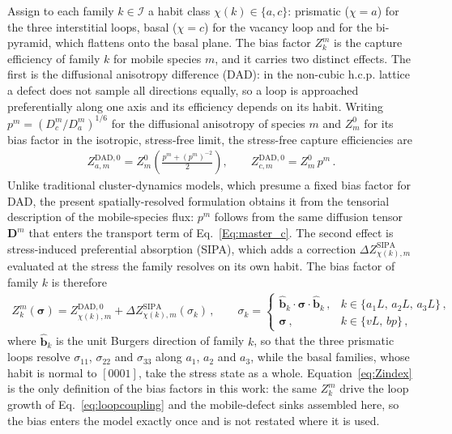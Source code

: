 \documentclass{article}
\begin{document}
Assign to each family $k\in\mathcal{I}$ a habit class $\chi(k)\in\{a,c\}$: prismatic ($\chi=a$) for the three interstitial loops, basal ($\chi=c$) for the vacancy loop and for the bi-pyramid, which flattens onto the basal plane. The bias factor $Z^m_k$ is the capture efficiency of family $k$ for mobile species $m$, and it carries two distinct effects. The first is the diffusional anisotropy difference (DAD): in the non-cubic h.c.p. lattice a defect does not sample all directions equally, so a loop is approached preferentially along one axis and its efficiency depends on its habit. Writing $p^m=(D_c^m/D_a^m)^{1/6}$ for the diffusional anisotropy of species $m$ and $Z^0_m$ for its bias factor in the isotropic, stress-free limit, the stress-free capture efficiencies are
\begin{align}\label{eq:DAD0}
Z^{\mathrm{DAD},0}_{a,m} = Z^0_m\left(\frac{p^m+(p^m)^{-2}}{2}\right),\qquad
Z^{\mathrm{DAD},0}_{c,m} = Z^0_m\, p^m\, .
\end{align}
Unlike traditional cluster-dynamics models, which presume a fixed bias factor for DAD, the present spatially-resolved formulation obtains it from the tensorial description of the mobile-species flux: $p^m$ follows from the same diffusion tensor $\bm D^m$ that enters the transport term of Eq.~\eqref{Eq:master_c}. The second effect is stress-induced preferential absorption (SIPA), which adds a correction $\Delta Z^{\mathrm{SIPA}}_{\chi(k),m}$ evaluated at the stress the family resolves on its own habit. The bias factor of family $k$ is therefore
\begin{align}\label{eq:Zindex}
Z^m_k(\bm\sigma)=Z^{\mathrm{DAD},0}_{\chi(k),m}+\Delta Z^{\mathrm{SIPA}}_{\chi(k),m}(\sigma_k)\, ,
\qquad
\sigma_k=
\begin{cases}
\hat{\bm b}_k\cdot\bm\sigma\cdot\hat{\bm b}_k\, , & k\in\{a_1L,\,a_2L,\,a_3L\}\, ,\\[2pt]
\bm\sigma\, , & k\in\{vL,\,bp\}\, ,
\end{cases}
\end{align}
where $\hat{\bm b}_k$ is the unit Burgers direction of family $k$, so that the three prismatic loops resolve $\sigma_{11}$, $\sigma_{22}$ and $\sigma_{33}$ along $a_1$, $a_2$ and $a_3$, while the basal families, whose habit is normal to $[0001]$, take the stress state as a whole. Equation~\eqref{eq:Zindex} is the only definition of the bias factors in this work: the same $Z^m_k$ drive the loop growth of Eq.~\eqref{eq:loopcoupling} and the mobile-defect sinks assembled here, so the bias enters the model exactly once and is not restated where it is used.
\end{document}
